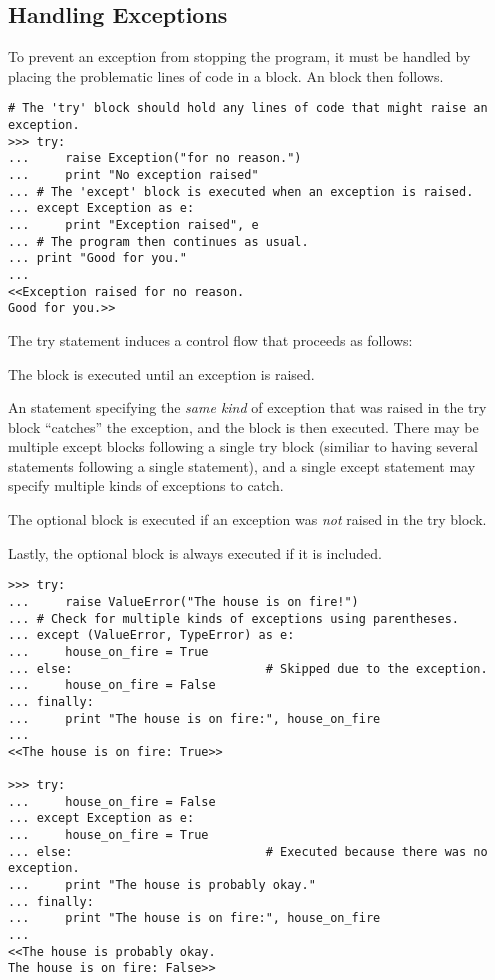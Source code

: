 \subsection*{Handling Exceptions} %

To prevent an exception from stopping the program, it must be handled by
placing the problematic lines of code in a  block.
An  block then follows.

\begin{lstlisting}
# The 'try' block should hold any lines of code that might raise an exception.
>>> try:
...     raise Exception("for no reason.")
...     print "No exception raised"
... # The 'except' block is executed when an exception is raised.
... except Exception as e:
...     print "Exception raised", e
... # The program then continues as usual.
... print "Good for you."
... 
<<Exception raised for no reason.
Good for you.>>
\end{lstlisting}
%
The try statement induces a control flow that proceeds as follows:
\begin{description}
\item The  block is executed until an exception is raised.
\item An  statement specifying the \emph{same kind} of exception that was raised in the try block ``catches'' the exception, and the block is then executed.
There may be multiple except blocks following a single try block (similiar to having several  statements following a single  statement), and a single except statement may specify multiple kinds of exceptions to catch.
\item The optional  block is executed if an exception was \emph{not} raised in the try block.
\item Lastly, the optional  block is always executed if it is included.
\end{description}

\begin{lstlisting}
>>> try:
...     raise ValueError("The house is on fire!")
... # Check for multiple kinds of exceptions using parentheses.
... except (ValueError, TypeError) as e:
...     house_on_fire = True
... else:                           # Skipped due to the exception.
...     house_on_fire = False
... finally:
...     print "The house is on fire:", house_on_fire
...
<<The house is on fire: True>>

>>> try:
...     house_on_fire = False
... except Exception as e:
...     house_on_fire = True
... else:                           # Executed because there was no exception.
...     print "The house is probably okay."
... finally:
...     print "The house is on fire:", house_on_fire
...
<<The house is probably okay.
The house is on fire: False>>
\end{lstlisting}

